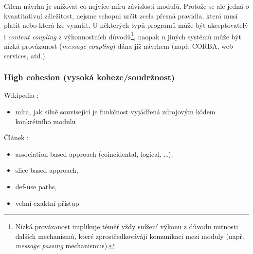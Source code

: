 \vspace{1cm}

Cílem návrhu je snižovat co nejvíce míru závislosti modulů. Protože se ale jedná o kvantitativní záležitost, nejsme schopni určit zcela přesná pravidla, která musí platit nebo která lze vynutit. U některých typů programů může být akceptovatelý i \emph{content coupling} z výkonnostních důvodů\footnote{Nízká provázanost implikuje téměř vždy snížení výkonu z důvodu nutnosti dalších mechanismů, které zprostředkovávájí komunikaci mezi moduly (např. \emph{message passing} mechanismus).}, naopak u jiných systémů může být nízká provázanost (\emph{message coupling}) dána již návrhem (např. CORBA, web services, atd.).


\subsubsection{High cohesion (vysoká koheze/soudržnost)}

Wikipedia \cite{wiki:cohesion}:
\begin{itemize}
\item míra, jak silně související je funkčnost vyjádřená zdrojovým kódem konkrétního modulu
\end{itemize}

Článek \cite{Kang:1996:DCM:872750.873361}:
\begin{itemize}
\item association-based approach (coincidental, logical, \ldots),
\item slice-based approach,
\item def-use paths,
\item velmi exaktní přístup.
\end{itemize}

